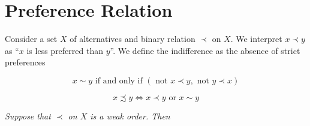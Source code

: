 \documentclass{article}
\theoremstyle{definition}
\def\tor{\text{ or }}
\def\tnot{\text{ not }}
\def\tiff{\text{ if and only if }}
\begin{document}
\section{Preference Relation}

Consider a set $X$ of alternatives and binary relation $\prec$ on $X$. We interpret $x\prec y$ as ``$x$ is less preferred than $y$''. We define the indifference as the absence of strict preferences

\begin{equation*}
x\sim y \tiff (\tnot x\prec y, \tnot y\prec x)
\end{equation*}


\begin{equation*}
x\precsim y\iff x\prec y \tor x\sim y
\end{equation*}

 {\it Suppose that $\prec$ on $X$ is a weak order. Then}
\end{document}
